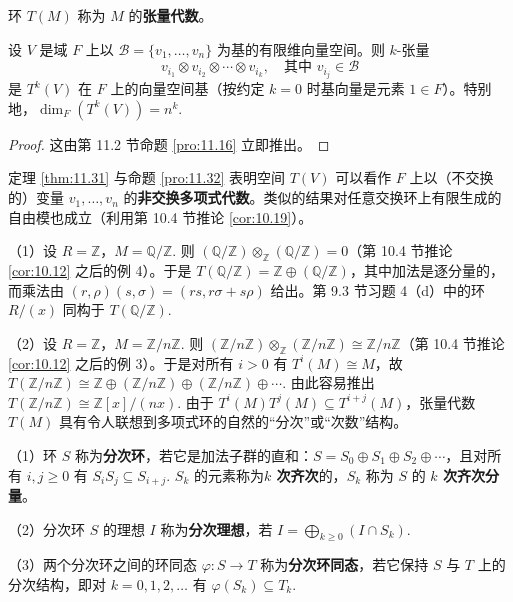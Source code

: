 \begin{definition}
环 \(T(M)\) 称为 \(M\) 的\textbf{张量代数}。
\end{definition}

\begin{proposition}\label{pro:11.32}
设 \(V\) 是域 \(F\) 上以 \(\mathcal{B} = \{v_1, \ldots, v_n\}\) 为基的有限维向量空间。则 \(k\)-张量
\[
v_{i_1} \otimes v_{i_2} \otimes \cdots \otimes v_{i_k}, \quad \text{其中 } v_{i_j} \in \mathcal{B}
\]
是 \(T^k(V)\) 在 \(F\) 上的向量空间基（按约定 \(k = 0\) 时基向量是元素 \(1 \in F\)）。特别地，\(\dim_F(T^k(V)) = n^k\).
\end{proposition}

\begin{proof}
这由第 11.2 节命题 \ref{pro:11.16} 立即推出。
\end{proof}

定理 \ref{thm:11.31} 与命题 \ref{pro:11.32} 表明空间 \(T(V)\) 可以看作 \(F\) 上以（不交换的）变量 \(v_1, \ldots, v_n\) 的\textbf{非交换多项式代数}。类似的结果对任意交换环上有限生成的自由模也成立（利用第 10.4 节推论 \ref{cor:10.19}）。

\begin{example}
（1）设 \(R = \mathbb{Z}\)，\(M = \mathbb{Q}/\mathbb{Z}\). 则 \((\mathbb{Q}/\mathbb{Z}) \otimes_{\mathbb{Z}} (\mathbb{Q}/\mathbb{Z}) = 0\)（第 10.4 节推论 \ref{cor:10.12} 之后的例 4）。于是 \(T(\mathbb{Q}/\mathbb{Z}) = \mathbb{Z} \oplus (\mathbb{Q}/\mathbb{Z})\)，其中加法是逐分量的，而乘法由 \((r, \rho)(s, \sigma) = (rs, r\sigma+s\rho)\) 给出。第 9.3 节习题 4（d）中的环 \(R/(x)\) 同构于 \(T(\mathbb{Q}/\mathbb{Z})\).

（2）设 \(R = \mathbb{Z}\)，\(M = \mathbb{Z}/n\mathbb{Z}\). 则 \((\mathbb{Z}/n\mathbb{Z}) \otimes_{\mathbb{Z}} (\mathbb{Z}/n\mathbb{Z}) \cong \mathbb{Z}/n\mathbb{Z}\)（第 10.4 节推论 \ref{cor:10.12} 之后的例 3）。于是对所有 \(i > 0\) 有 \(T^i(M) \cong M\)，故 \(T(\mathbb{Z}/n\mathbb{Z}) \cong \mathbb{Z} \oplus (\mathbb{Z}/n\mathbb{Z}) \oplus (\mathbb{Z}/n\mathbb{Z}) \oplus \cdots\). 由此容易推出 \(T(\mathbb{Z}/n\mathbb{Z}) \cong \mathbb{Z}[x]/(nx)\). 由于 \(T^i(M)T^j(M) \subseteq T^{i+j}(M)\)，张量代数 \(T(M)\) 具有令人联想到多项式环的自然的“分次”或“次数”结构。
\end{example}

\begin{definition}
（1）环 \(S\) 称为\textbf{分次环}，若它是加法子群的直和：\(S = S_0 \oplus S_1 \oplus S_2 \oplus \cdots\)，且对所有 \(i, j \geq 0\) 有 \(S_iS_j \subseteq S_{i+j}\). \(S_k\) 的元素称为\textbf{\(k\) 次齐次}的，\(S_k\) 称为 \(S\) 的 \textbf{\(k\) 次齐次分量}。

（2）分次环 \(S\) 的理想 \(I\) 称为\textbf{分次理想}，若 \(I = \bigoplus_{k \geq 0}(I \cap S_k)\).

（3）两个分次环之间的环同态 \(\varphi : S \to T\) 称为\textbf{分次环同态}，若它保持 \(S\) 与 \(T\) 上的分次结构，即对 \(k = 0, 1, 2, \ldots\) 有 \(\varphi(S_k) \subseteq T_k\).
\end{definition}

